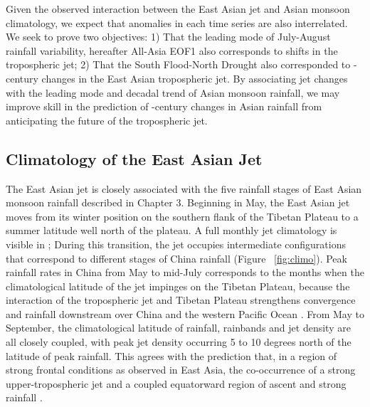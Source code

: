 	Given the observed interaction between the East Asian jet and Asian monsoon climatology, we expect that anomalies in each time series are also interrelated. We seek to prove two objectives: 1) That the leading mode of July-August rainfall variability, hereafter All-Asia EOF1 \citep{Day2015} also corresponds to shifts in the tropospheric jet; 2) That the South Flood-North Drought also corresponded to -century changes in the East Asian tropospheric jet. By associating jet changes with the leading mode and decadal trend of Asian monsoon rainfall, we may improve skill in the prediction of -century changes in Asian rainfall from anticipating the future of the tropospheric jet.
	
\subsection{Climatology of the East Asian Jet}

	The East Asian jet is closely associated with the five rainfall stages of East Asian monsoon rainfall described in Chapter 3. Beginning in May, the East Asian jet moves from its winter position on the southern flank of the Tibetan Plateau to a summer latitude well north of the plateau.  A full monthly jet climatology is visible in \citet{Schiemann2009}; During this transition, the jet occupies intermediate configurations that correspond to different stages of China rainfall (Figure ~\ref{fig:climo}). Peak rainfall rates in China from May to mid-July corresponds to the months when the climatological latitude of the jet impinges on the Tibetan Plateau, because the interaction of the tropospheric jet and Tibetan Plateau strengthens convergence and rainfall downstream over China and the western Pacific Ocean \citep{Molnar2010,Sampe2010,Chen2014}. From May to September,  the climatological latitude of rainfall, rainbands and jet density are all closely coupled, with peak jet density occurring 5 to 10 degrees north of the latitude of peak rainfall. This agrees with the prediction that, in a region of strong frontal conditions as observed in East Asia, the co-occurrence of a strong upper-tropospheric jet and a coupled equatorward region of ascent and strong rainfall \citep{Holton2004}. 
	
